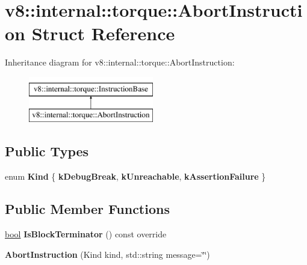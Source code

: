 \hypertarget{structv8_1_1internal_1_1torque_1_1AbortInstruction}{}\section{v8\+:\+:internal\+:\+:torque\+:\+:Abort\+Instruction Struct Reference}
\label{structv8_1_1internal_1_1torque_1_1AbortInstruction}
Inheritance diagram for v8\+:\+:internal\+:\+:torque\+:\+:Abort\+Instruction\+:\begin{figure}[H]
\begin{center}
\leavevmode
\includegraphics[height=2.000000cm]{structv8_1_1internal_1_1torque_1_1AbortInstruction}
\end{center}
\end{figure}
\subsection*{Public Types}
\begin{DoxyCompactItemize}
\item 
\mbox{\label{structv8_1_1internal_1_1torque_1_1AbortInstruction_a3344046b1651f0b1f38667d9d19c6a78}} 
enum {\bfseries Kind} \{ {\bfseries k\+Debug\+Break}, 
{\bfseries k\+Unreachable}, 
{\bfseries k\+Assertion\+Failure}
 \}
\end{DoxyCompactItemize}
\subsection*{Public Member Functions}
\begin{DoxyCompactItemize}
\item 
\mbox{\label{structv8_1_1internal_1_1torque_1_1AbortInstruction_a9611dd2ae1f65e371cdc7241e8706d4f}} 
\mbox{\hyperlink{classbool}{bool}} {\bfseries Is\+Block\+Terminator} () const override
\item 
\mbox{\label{structv8_1_1internal_1_1torque_1_1AbortInstruction_a45ae13873858488883dc632ad51b17d3}} 
{\bfseries Abort\+Instruction} (Kind kind, std\+::string message=\char`\"{}\char`\"{})
\end{DoxyCompactItemize}

